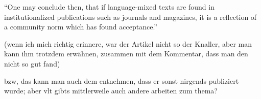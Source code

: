 ``One may conclude then, that if language-mixed
texts are found in institutionalized publications such as journals and magazines, it is a
reflection of a community norm which has found acceptance.''


(wenn ich mich richtig erinnere, war der Artikel nicht so der Knaller, aber man kann ihm trotzdem erwähnen, zusammen mit dem Kommentar, dass man den nicht so gut fand)

bzw, das kann man auch dem entnehmen, dass er sonst nirgends publiziert wurde;
aber vlt gibts mittlerweile auch andere arbeiten zum thema?
